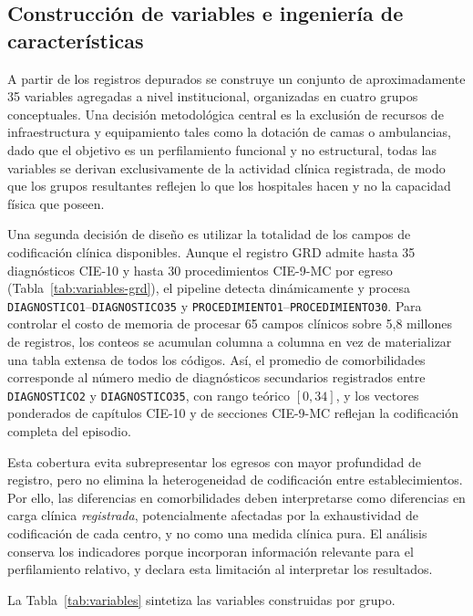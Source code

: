 \subsection{Construcción de variables e ingeniería de características}
\label{sec:variables}

A partir de los registros depurados se construye un conjunto de aproximadamente
35 variables agregadas a nivel institucional, organizadas en cuatro grupos
conceptuales. Una decisión metodológica central es la exclusión de recursos de infraestructura y equipamiento tales como la dotación de camas o ambulancias, dado que el objetivo es un perfilamiento funcional y no
estructural, todas las variables se derivan exclusivamente de la actividad clínica
registrada, de modo que los grupos resultantes reflejen lo que los hospitales
hacen y no la capacidad física que poseen.

Una segunda decisión de diseño es utilizar la totalidad de los campos de
codificación clínica disponibles. Aunque el registro GRD admite hasta 35
diagnósticos CIE-10 y hasta 30 procedimientos CIE-9-MC por egreso
(Tabla~\ref{tab:variables-grd}), el pipeline detecta dinámicamente y procesa
\texttt{DIAGNOSTICO1}--\texttt{DIAGNOSTICO35} y
\texttt{PROCEDIMIENTO1}--\texttt{PROCEDIMIENTO30}. Para controlar el costo de
memoria de procesar 65 campos clínicos sobre 5{,}8 millones de registros, los
conteos se acumulan columna a columna en vez de materializar una tabla extensa
de todos los códigos. Así, el promedio de comorbilidades corresponde al número
medio de diagnósticos secundarios registrados entre
\texttt{DIAGNOSTICO2} y \texttt{DIAGNOSTICO35}, con rango teórico $[0,34]$,
y los vectores ponderados de capítulos CIE-10 y de secciones CIE-9-MC reflejan
la codificación completa del episodio.

Esta cobertura evita subrepresentar los egresos con mayor profundidad de
registro, pero no elimina la heterogeneidad de codificación entre
establecimientos. Por ello, las diferencias en comorbilidades deben interpretarse
como diferencias en carga clínica \emph{registrada}, potencialmente afectadas por
la exhaustividad de codificación de cada centro, y no como una medida clínica
pura. El análisis conserva los indicadores porque incorporan información
relevante para el perfilamiento relativo, y declara esta limitación al
interpretar los resultados.

La Tabla~\ref{tab:variables} sintetiza las variables construidas por grupo.

